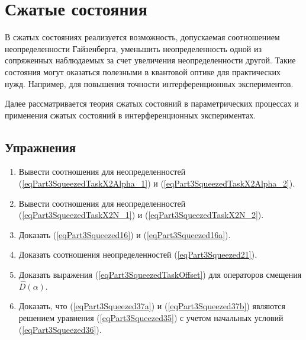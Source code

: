 \chapter{Сжатые состояния}
\label{chSqueezed}
В сжатых состояниях реализуется возможность, допускаемая соотношением
неопределенности Гайзенберга, уменьшить неопределенность одной из
сопряженных наблюдаемых за счет увеличения неопределенности другой.
Такие состояния могут оказаться полезными в квантовой оптике для
практических нужд. Например, для повышения точности интерференционных
экспериментов. 

Далее рассматривается теория сжатых состояний в параметрических
процессах и применения сжатых состояний в интерференционных
экспериментах. 









\section{Упражнения}
\begin{enumerate}
\item Вывести соотношения для неопределенностей
  (\ref{eqPart3SqueezedTaskX2Alpha_1}) и
  (\ref{eqPart3SqueezedTaskX2Alpha_2}).
\item Вывести соотношения для неопределенностей
  (\ref{eqPart3SqueezedTaskX2N_1}) и
  (\ref{eqPart3SqueezedTaskX2N_2}).
\item Доказать (\ref{eqPart3Squeezed16}) и
  (\ref{eqPart3Squeezed16a}). 
\item Доказать соотношения неопределенностей
  (\ref{eqPart3Squeezed21}). 
\item Доказать выражения (\ref{eqPart3SqueezedTaskOffset}) для
  операторов смещения $\hat{D}\left(\alpha\right)$.
\item Доказать, что (\ref{eqPart3Squeezed37a}) и
  (\ref{eqPart3Squeezed37b}) являются решением 
  уравнения (\ref{eqPart3Squeezed35}) с учетом начальных
  условий (\ref{eqPart3Squeezed36}).
\end{enumerate}
